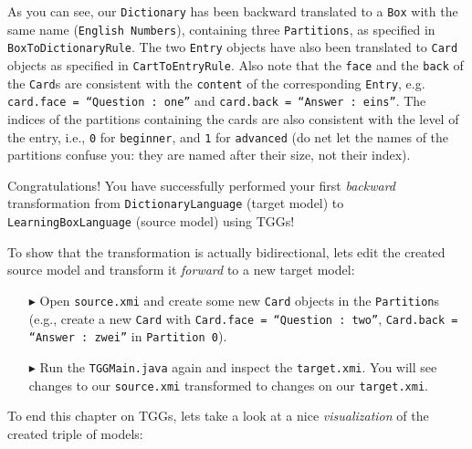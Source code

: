 As you can see, our \texttt{Dictionary} has been backward translated to a \texttt{Box} with the same name (\texttt{English Numbers}), containing three \texttt{Par\-ti\-tions}, as specified in \texttt{Box\-To\-Dictionary\-Rule}.
The two \texttt{Entry} objects have also been translated to \texttt{Card} objects as specified in \texttt{CartToEntryRule}.
Also note that the \texttt{face} and the \texttt{back} of the \texttt{Card}s are consistent with the \texttt{content} of the corresponding \texttt{Entry}, e.g. \texttt{card.face = ``Question : one''} and \texttt{card.back = ``Answer : eins''}.
The indices of the partitions containing the cards are also consistent with the level of the entry, i.e., \texttt{0} for \texttt{beginner}, and \texttt{1} for \texttt{advanced} (do net let the names of the partitions confuse you: they are named after their size, not their index).

Congratulations! You have successfully performed your first \emph{backward} transformation from \texttt{Dictionary\-Language} (target model) to \texttt{Learn\-ing\-Box\-Lan\-guage} (source model) using TGGs!

To show that the transformation is actually bidirectional, lets edit the created source model and transform it \emph{forward} to a new target model:

\begin{enumerate}
\item[$\blacktriangleright$] Open \texttt{source.xmi} and create some new \texttt{Card} objects in the \texttt{Partition}s (e.g., create a new \texttt{Card} with \texttt{Card.face = ``Question : two''}, \texttt{Card.back = ``Answer : zwei''} in \texttt{Partition 0}).

\item[$\blacktriangleright$] Run the \texttt{TGGMain.java} again and inspect the \texttt{target.xmi}. You will see changes to our \texttt{source.xmi} transformed to changes on our \texttt{target.xmi}.

\end{enumerate}

To end this chapter on TGGs, lets take a look at a nice \emph{visualization} of the created triple of models:

